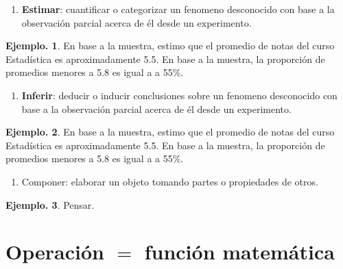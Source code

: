 \documentclass[]{book}
\providecommand{\tightlist}{%
  \setlength{\itemsep}{0pt}\setlength{\parskip}{0pt}}
\theoremstyle{definition}
\theoremstyle{definition}
\newtheorem{example}{Ejemplo.}[chapter]
\theoremstyle{definition}
\theoremstyle{remark}
\begin{document}
\begin{enumerate}
\def\labelenumi{\arabic{enumi}.}
\setcounter{enumi}{5}
\tightlist
\item
  \textbf{Estimar}: cuantificar o categorizar un fenomeno desconocido con base a la observación
  parcial acerca de él desde un experimento.
\end{enumerate}

\begin{example}
\protect\hypertarget{exm:unnamed-chunk-32}{}{\label{exm:unnamed-chunk-32} }
En base a la muestra, estimo que el promedio de notas del curso Estadística es aproximadamente 5.5.
En base a la muestra, la proporción de promedios menores a 5.8 es igual a a 55\%.
\end{example}

\begin{enumerate}
\def\labelenumi{\arabic{enumi}.}
\setcounter{enumi}{6}
\tightlist
\item
  \textbf{Inferir}: deducir o inducir conclusiones sobre un fenomeno desconocido con base a la observación
  parcial acerca de él desde un experimento.
\end{enumerate}

\begin{example}
\protect\hypertarget{exm:unnamed-chunk-33}{}{\label{exm:unnamed-chunk-33} }
En base a la muestra, estimo que el promedio de notas del curso Estadística es aproximadamente 5.5.
En base a la muestra, la proporción de promedios menores a 5.8 es igual a a 55\%.
\end{example}

\begin{enumerate}
\def\labelenumi{\arabic{enumi}.}
\setcounter{enumi}{7}
\tightlist
\item
  Componer: elaborar un objeto tomando partes o propiedades de otros.
\end{enumerate}

\begin{example}
\protect\hypertarget{exm:unnamed-chunk-34}{}{\label{exm:unnamed-chunk-34} }
Pensar.
\end{example}

\hypertarget{operaciuxf3n-funciuxf3n-matemuxe1tica}{%
\section*{\texorpdfstring{Operación \(=\) función matemática}{Operación = función matemática}}\label{operaciuxf3n-funciuxf3n-matemuxe1tica}}
\end{document}
